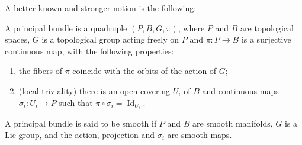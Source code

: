 A better known and stronger notion is the following:
\begin{defi} A principal bundle is a quadruple $(P,B,G,\pi)$, where $P$ and $B$ are topological spaces, $G$ is a topological group acting freely on $P$ and $\pi\colon P\rightarrow B$ is a surjective continuous map, with the following properties:
\begin{enumerate}\itemsep=0pt
\item[1)] the fibers of $\pi$ coincide with the orbits of the action of $G$;
\item[2)] (local triviality) there is an open covering $U_i$ of $B$ and continuous maps $\sigma_i\colon U_i\rightarrow P$ such that $\pi\circ\sigma_i=\operatorname{Id}_{U_i}$.
\end{enumerate}
A principal bundle is said to be smooth if $P$ and $B$ are smooth manifolds, $G$ is a Lie group, and the action, projection and $\sigma_i$ are smooth maps.
\end{defi}

